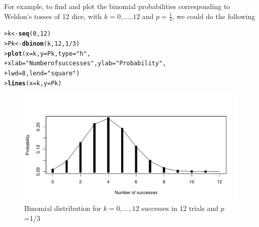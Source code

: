 \documentclass[10pt,krantz2]{krantz}\usepackage[]{graphicx}\usepackage[]{color}
\makeatletter
\newcommand{\hlnum}[1]{\textcolor[rgb]{0.686,0.059,0.569}{#1}}%
\newcommand{\hlstr}[1]{\textcolor[rgb]{0.192,0.494,0.8}{#1}}%
\newcommand{\hlopt}[1]{\textcolor[rgb]{0,0,0}{#1}}%
\newcommand{\hlstd}[1]{\textcolor[rgb]{0.345,0.345,0.345}{#1}}%
\newcommand{\hlkwb}[1]{\textcolor[rgb]{0.69,0.353,0.396}{#1}}%
\newcommand{\hlkwc}[1]{\textcolor[rgb]{0.333,0.667,0.333}{#1}}%
\newcommand{\hlkwd}[1]{\textcolor[rgb]{0.737,0.353,0.396}{\textbf{#1}}}%
\newenvironment{kframe}{%
 \def\at@end@of@kframe{}%
 \ifinner\ifhmode%
  \def\at@end@of@kframe{\end{minipage}}%
  \begin{minipage}{\columnwidth}%
 \fi\fi%
 \def\FrameCommand##1{\hskip\@totalleftmargin \hskip-\fboxsep
 \colorbox{shadecolor}{##1}\hskip-\fboxsep
     \hskip-\linewidth \hskip-\@totalleftmargin \hskip\columnwidth}%
 \MakeFramed {\advance\hsize-\width
   \@totalleftmargin\z@ \linewidth\hsize
   \@setminipage}}%
 {\par\unskip\endMakeFramed%
 \at@end@of@kframe}
\newenvironment{knitrout}{}{} %
\renewenvironment{knitrout}{\small\renewcommand{\baselinestretch}{.85}}{} %
\makeatother
\begin{document}
For example, to find and plot the binomial probabilities corresponding
to Weldon's tosses of 12 dice, with $k=0, \dots, 12$ and $p=\frac13$,
we could do the following
\begin{knitrout}
\color{fgcolor}\begin{kframe}
\begin{alltt}
\hlstd{> }\hlstd{k} \hlkwb{<-} \hlkwd{seq}\hlstd{(}\hlnum{0}\hlstd{,} \hlnum{12}\hlstd{)}
\hlstd{> }\hlstd{Pk} \hlkwb{<-} \hlkwd{dbinom}\hlstd{(k,} \hlnum{12}\hlstd{,} \hlnum{1}\hlopt{/}\hlnum{3}\hlstd{)}
\hlstd{> }\hlkwd{plot}\hlstd{(}\hlkwc{x} \hlstd{= k,} \hlkwc{y} \hlstd{= Pk,} \hlkwc{type} \hlstd{=} \hlstr{"h"}\hlstd{,}
\hlstd{+ }     \hlkwc{xlab} \hlstd{=} \hlstr{"Number of successes"}\hlstd{,} \hlkwc{ylab} \hlstd{=} \hlstr{"Probability"}\hlstd{,}
\hlstd{+ }     \hlkwc{lwd} \hlstd{=} \hlnum{8}\hlstd{,} \hlkwc{lend} \hlstd{=} \hlstr{"square"}\hlstd{)}
\hlstd{> }\hlkwd{lines}\hlstd{(}\hlkwc{x} \hlstd{= k,} \hlkwc{y} \hlstd{= Pk)}
\end{alltt}
\end{kframe}\begin{figure}[!htbp]

\centerline{\includegraphics[width=.75\textwidth]{ch03/fig/dbinom1-1} }

\caption[Binomial distribution for ]{Binomial distribution for $k=0,\dots,12$ successes in 12 trials and $p$=1/3\label{fig:dbinom1}}
\end{figure}


\end{knitrout}
\end{document}
